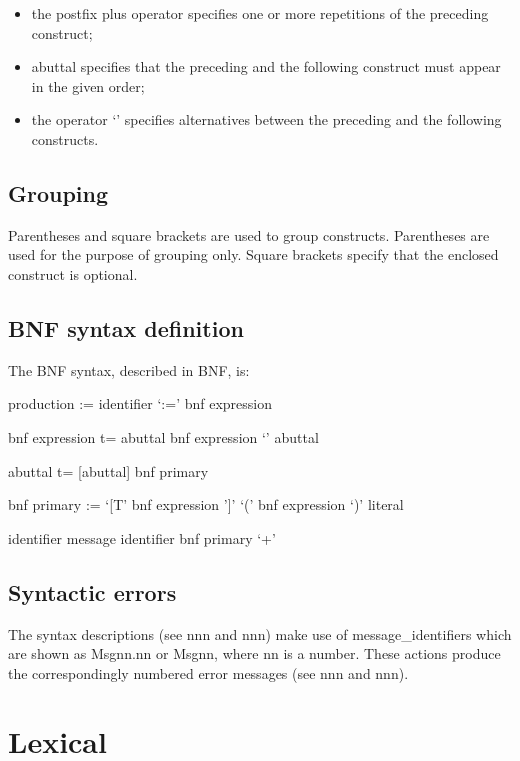 \begin{itemize}
\item
  the postfix plus operator specifies one or more repetitions of the
  preceding construct;
\item
  abuttal specifies that the preceding and the following construct must
  appear in the given order;
\item
  the operator `\textbar{}' specifies alternatives between the preceding
  and the following constructs.
\end{itemize}

\hypertarget{grouping}{%
\subsection{Grouping}\label{grouping}}

Parentheses and square brackets are used to group constructs.
Parentheses are used for the purpose of grouping only. Square brackets
specify that the enclosed construct is optional.

\hypertarget{bnf-syntax-definition}{%
\subsection{BNF syntax definition}\label{bnf-syntax-definition}}

The BNF syntax, described in BNF, is:

production := identifier `:=' bnf expression

bnf expression t= abuttal \textbar{} bnf expression `\textbar{}' abuttal

abuttal t= {[}abuttal{]} bnf primary

bnf primary := `{[}T' bnf expression '{]}' \textbar{} `(' bnf expression
`)' \textbar{} literal \textbar{}

identifier \textbar{} message identifier \textbar{} bnf primary `+'

\hypertarget{syntactic-errors}{%
\subsection{Syntactic errors}\label{syntactic-errors}}

The syntax descriptions (see nnn and nnn) make use of
message\_identifiers which are shown as Msgnn.nn or Msgnn, where nn is a
number. These actions produce the correspondingly numbered error
messages (see nnn and nnn).

\hypertarget{lexical}{%
\section{Lexical}\label{lexical}}

